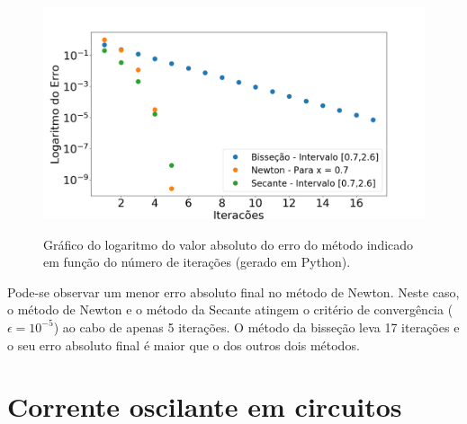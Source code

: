 \documentclass[aps,pre,twocolumn,showpacs,amsmath,amssymb]{revtex4-1}
\begin{document}
\begin{figure}[h]\vspace{-7ex}
   \begin{center}
    \includegraphics[width=\columnwidth]{Figure_2.png} \\
\caption{Gráfico do logaritmo do valor absoluto do erro do método indicado em função do número de iterações (gerado em Python).}
  \label{fig.exemplo}
   \end{center}
\end{figure}

Pode-se observar um menor erro absoluto final no método de Newton. Neste caso, o método de Newton e o método da Secante atingem o critério de convergência ($\epsilon=10^{-5}$) ao cabo de apenas 5 iterações. O método da bisseção leva 17 iterações e o seu erro absoluto final é maior que o dos outros dois métodos.



\section{Corrente oscilante em circuitos}
\end{document}
